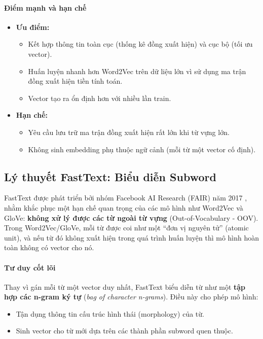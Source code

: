 \paragraph{Điểm mạnh và hạn chế}
\begin{itemize}
    \item \textbf{Ưu điểm:} 
    \begin{itemize}
        \item Kết hợp thông tin toàn cục (thống kê đồng xuất hiện) và cục bộ (tối ưu vector).
        \item Huấn luyện nhanh hơn Word2Vec trên dữ liệu lớn vì sử dụng ma trận đồng xuất hiện tiền tính toán.
        \item Vector tạo ra ổn định hơn với nhiều lần train.
    \end{itemize}
    \item \textbf{Hạn chế:}
    \begin{itemize}
        \item Yêu cầu lưu trữ ma trận đồng xuất hiện rất lớn khi từ vựng lớn.
        \item Không sinh embedding phụ thuộc ngữ cảnh (mỗi từ một vector cố định).
    \end{itemize}
\end{itemize}

\subsection{Lý thuyết FastText: Biểu diễn Subword}
\label{ssec:fasttext}

FastText được phát triển bởi nhóm Facebook AI Research (FAIR) năm 2017 \cite{bojanowski2017enriching}, nhằm khắc phục một hạn chế quan trọng của các mô hình như Word2Vec và GloVe: \textbf{không xử lý được các từ ngoài từ vựng} (Out-of-Vocabulary - OOV).  
Trong Word2Vec/GloVe, mỗi từ được coi như một “đơn vị nguyên tử” (atomic unit), và nếu từ đó không xuất hiện trong quá trình huấn luyện thì mô hình hoàn toàn không có vector cho nó.  

\paragraph{Tư duy cốt lõi}
Thay vì gán mỗi từ một vector duy nhất, FastText biểu diễn từ như một \textbf{tập hợp các n-gram ký tự} (\textit{bag of character n-grams}). Điều này cho phép mô hình:
\begin{itemize}
    \item Tận dụng thông tin cấu trúc hình thái (morphology) của từ.
    \item Sinh vector cho từ mới dựa trên các thành phần subword quen thuộc.
\end{itemize}

